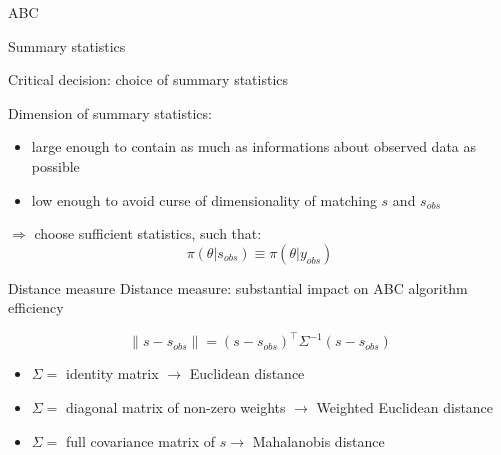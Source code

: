 \documentclass{beamer}
\theoremstyle{plain}
\begin{document}
\begin{section}{ABC}
\begin{frame}{Summary statistics}

	Critical decision: choice of summary statistics
	
	\vspace{0.3cm}
	Dimension of summary statistics:
	\begin{itemize}
		\item large enough to contain as much as informations about observed data as possible
		\item low enough to avoid curse of dimensionality of matching $s$ and $s_{obs}$
	\end{itemize}

	\vspace{0.3cm}
	$\Longrightarrow$ choose sufficient statistics, such that:
	\[   \pi(\theta|s_{obs}) \equiv \pi(\theta|y_{obs})   \]

\end{frame}

\begin{frame}{Distance measure}
	Distance measure: substantial impact on ABC algorithm efficiency
	
	\[  \parallel s - s_{obs} \parallel = (s - s_{obs})^\top \Sigma^{-1} (s - s_{obs}) \]
	
	\begin{itemize}
		\item $\Sigma = $ identity matrix $ \rightarrow$ Euclidean distance 
		\item $\Sigma =$ diagonal matrix of non-zero weights $ \rightarrow$ Weighted Euclidean distance 
		\item $\Sigma = $ full covariance matrix of $s \rightarrow$ Mahalanobis distance 
	\end{itemize}
\end{frame}


\end{section}
\end{document}
